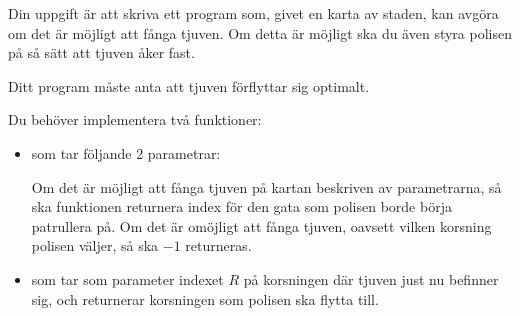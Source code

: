 \documentclass{boi2014-se}
\begin{document}
    \Task
    Din uppgift är att skriva ett program som, givet en karta av staden,
    kan avgöra om det är möjligt att fånga tjuven. Om detta är möjligt
    ska du även styra polisen på så sätt att tjuven åker fast.

    Ditt program måste anta att tjuven förflyttar sig optimalt.

    \Implementation
    Du behöver implementera två funktioner:
    \begin{itemize}
        \item {} som tar följande 2 parametrar:

            Om det är möjligt att fånga tjuven på kartan beskriven av parametrarna,
            så ska funktionen  returnera index för den gata som polisen
            borde börja patrullera på. Om det är omöjligt att fånga tjuven, oavsett vilken
            korsning polisen väljer, så ska $-1$ returneras.
 
         \item {} som tar som parameter indexet $R$ på korsningen där
             tjuven just nu befinner sig, och returnerar korsningen som polisen ska flytta till.

    \end{itemize}
\end{document}

